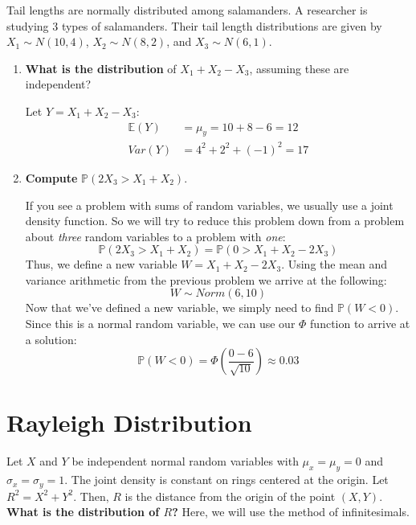 \documentclass[titlepage, 12pt, leqno]{article}
\begin{document}
\begin{ex}
    Tail lengths are normally distributed among salamanders. A researcher is 
    studying 3 types of salamanders. Their tail length distributions are given
    by $X_1 \sim N(10,4)$, $X_2 \sim N(8,2)$, and $X_3 \sim N(6,1)$.
    \begin{enumerate}
        \item \textbf{What is the distribution} of $X_1 + X_2 - X_3$, assuming these 
            are independent?
            \vspace{10px}
            
            Let $Y = X_1 + X_2 - X_3$:
            \begin{align*}
                \mathbb{E}(Y) &= \mu_y = 10 + 8 - 6 = \boxed{12} \\
                Var(Y) &= 4^2 + 2^2 + (-1)^2 = \boxed{17}
            \end{align*}
        \item \textbf{Compute} $\mathbb{P}(2X_3 > X_1 + X_2)$.
            \vspace{10px}
            
            If you see a problem with sums of random variables, we usually use a joint
            density function. So we will try to reduce this problem down from a problem
            about \textit{three} random variables to a problem with \textit{one}:
            \[
                \mathbb{P}(2X_3 > X_1 + X_2) = \mathbb{P}(0 > X_1 + X_2 - 2X_3)
            \]
            Thus, we define a new variable $W = X_1 + X_2 - 2X_3$. Using the mean and 
            variance arithmetic from the previous problem we arrive at the following:
            \[
                W \sim Norm(6,10)
            \]
            Now that we've defined a new variable, we simply need to find
            $\mathbb{P}(W < 0)$. Since this is a normal random variable, we can use our
            $\Phi$ function to arrive at a solution:
            \[
                \mathbb{P}(W<0) = \Phi\left(\frac{0-6}{\sqrt{10}}\right) \approx 
                \boxed{0.03}            
            \]
    \end{enumerate}
\end{ex}

\pagebreak
\section{Rayleigh Distribution}
Let $X$ and $Y$ be independent normal random variables with $\mu_x = \mu_y = 0$ and
$\sigma_x = \sigma_y = 1$. The joint density is constant on rings centered at the origin.
Let $R^2 = X^2 + Y^2$. Then, $R$ is the distance from the origin of the point $(X,Y)$.
\textbf{What is the distribution of $R$?} Here, we will use the method of infinitesimals.
\end{document}
